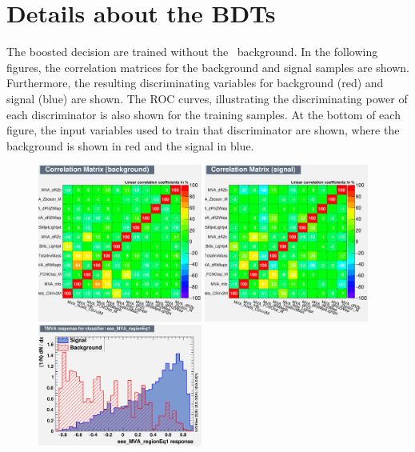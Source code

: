 \chapter{Details about the BDTs}
\label{app:BDTtechnics}
The boosted decision are trained without the \NPL\ background. In the following figures, the correlation matrices for the background and signal samples are shown. Furthermore, the resulting discriminating variables for background (red) and signal (blue) are shown. The ROC curves, illustrating the discriminating power of each discriminator is also shown for the training samples. At the bottom of each figure, the input variables used to train that discriminator are shown, where the background is shown in red and the signal in blue.
\begin{figure}[htbp]
	\includegraphics[width=0.48\textwidth]{6_Search/Figures/MVAtechnics/toppairzct/eee/CorrelationMatrixB.png}
	\includegraphics[width=0.48\textwidth]{6_Search/Figures/MVAtechnics/toppairzct/eee/CorrelationMatrixS.png}
	\includegraphics[width=0.48\textwidth]{6_Search/Figures/MVAtechnics/toppairzct/eee/mva_eee_MVA_regionEq1.png}

\end{figure}

